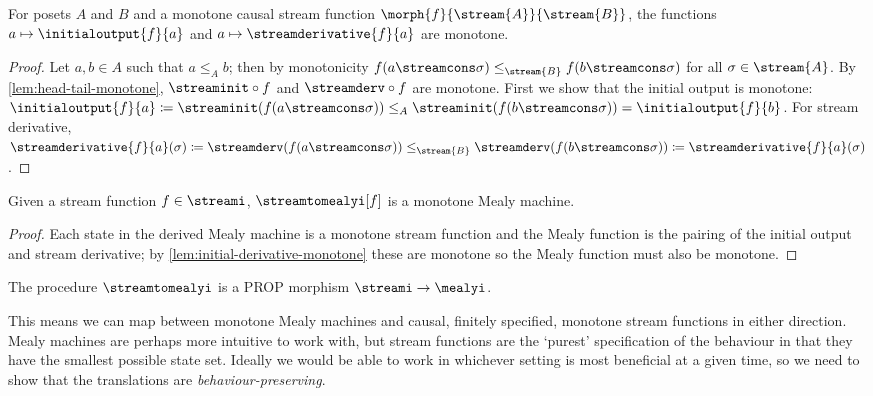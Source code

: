 \begin{lemma}\label{lem:initial-derivative-monotone}
    For posets \(A\) and \(B\) and a monotone causal stream function
    \(\morph{f}{\stream{A}}{\stream{B}}\), the functions
    \(a \mapsto \initialoutput{f}{a}\) and \(a \mapsto \streamderivative{f}{a}\)
    are monotone.
\end{lemma}
\begin{proof}
    Let \(a, b \in A\) such that \(a \leq_A b\); then by monotonicity
    \(f(a \streamcons \sigma) \leq_{\stream{B}} f(b \streamcons \sigma)\) for
    all \(\sigma \in \stream{A}\).
    By \cref{lem:head-tail-monotone}, \(\streaminit \circ f\) and
    \(\streamderv \circ f\) are monotone.
    First we show that the initial output is monotone: \(
    \initialoutput{f}{a} \coloneqq
    \streaminit(f(a \streamcons \sigma)) \leq_{A}
    \streaminit(f(b \streamcons \sigma)) =
    \initialoutput{f}{b}
    \).
    For stream derivative, \(
    \streamderivative{f}{a}(\sigma) \coloneqq
    \streamderv(f(a \streamcons \sigma)) \leq_{\stream{B}}
    \streamderv(f(b \streamcons \sigma)) \coloneqq
    \streamderivative{f}{a}(\sigma)
    \).
\end{proof}

\begin{lemma}\label{lem:stream-to-mealy-is-monotone}
    Given a stream function \(f \in \streami\), \(\streamtomealyi[f]\) is
    a monotone Mealy machine.
\end{lemma}
\begin{proof}
    Each state in the derived Mealy machine is a monotone stream function and
    the Mealy function is the pairing of the initial output and stream
    derivative; by \cref{lem:initial-derivative-monotone} these are monotone so
    the Mealy function must also be monotone.
\end{proof}

\begin{corollary}
    The procedure \(\streamtomealyi\) is a PROP morphism
    \(\streami \to \mealyi\).
\end{corollary}

This means we can map between monotone Mealy machines and causal, finitely
specified, monotone stream functions in either direction.
Mealy machines are perhaps more intuitive to work with, but stream functions
are the `purest' specification of the behaviour in that they have the smallest
possible state set.
Ideally we would be able to work in whichever setting is most beneficial at a
given time, so we need to show that the translations are
\emph{behaviour-preserving}.

